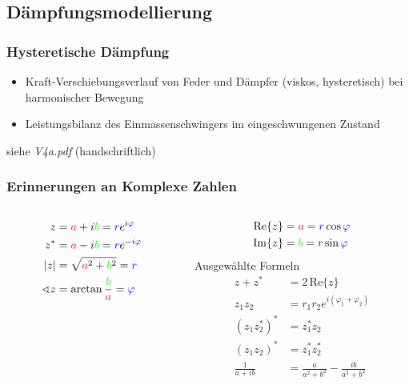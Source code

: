 \subsection{Dämpfungsmodellierung}
\begin{frame}
\frametitle{Hysteretische Dämpfung}
\begin{itemize}
 \item Kraft-Verschiebungsverlauf von Feder und Dämpfer (viskos, hysteretisch) bei harmonischer Bewegung
 \item Leistungsbilanz des Einmassenschwingers im eingeschwungenen Zustand
\end{itemize}
\vfill

\hfill siehe \textsl{V4a.pdf} (handschriftlich)
\end{frame}


\begin{frame}
\frametitle{Erinnerungen an Komplexe Zahlen}
\begin{columns}
        \begin{column}[t]{.3\linewidth}

         \begin{align*}
          z&={\color{red}a}+i{\color{green}b}={\color{blue}r}e^{i{\color{blue}\varphi}}\\
          z^*&={\color{red}a}-i{\color{green}b}={\color{blue}r}e^{-i{\color{blue}\varphi}}\\
          |z|&=\sqrt{{\color{red}a}^2+{\color{green}b}^2}={\color{blue}r}\\
          \sphericalangle z &=\arctan\frac{\color{green}b}{\color{red}a}={\color{blue}\varphi}
         \end{align*}
        \end{column}
        \begin{column}[t]{.7\linewidth}
        \vspace{-3cm}
        \begin{align*}
         \mathrm{Re}\{z\}&={\color{red}a}  ={\color{blue}r}\cos{\color{blue}\varphi}\\
         \mathrm{Im}\{z\}&={\color{green}b}={\color{blue}r}\sin{\color{blue}\varphi}
        \end{align*}
        \hspace{2cm} Ausgewählte Formeln
         \begin{align*}
          z+z^*&=2\,\mathrm{Re}\{z\}\\
          z_1z_2&=r_1r_2 e^{i(\varphi_1+\varphi_2)}\\
          (z_1z_2^*)^*&=z_1^*z_2\\
          (z_1 z_2)^*&=z_1^*z_2^*\\
          \frac{1}{a+ib}&=\frac{a}{a^2+b^2}-\frac{ib}{a^2+b^2}
         \end{align*}
        \end{column}
\end{columns}
\end{frame}


